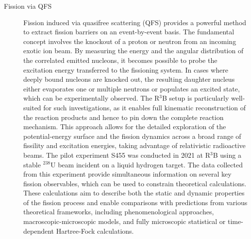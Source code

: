 \begin{description}
\item[Fission via QFS]Fission induced via quasifree scattering (QFS) provides a powerful method to extract fission barriers on an event-by-event basis. The fundamental concept involves the knockout of a proton or neutron from an incoming exotic ion beam. By measuring the energy  and the angular distribution of the correlated emitted nucleons, it becomes possible to probe the excitation energy transferred to the fissioning system. In cases where deeply bound nucleons are knocked out, the resulting daughter nucleus either evaporates one or multiple neutrons or populates an excited state, which can be experimentally observed. The R$^3$B setup is particularly well-suited for such investigations, as it enables full kinematic reconstruction of the reaction products and hence to pin down the complete reaction mechanism. This approach allows for the detailed exploration of the potential-energy surface and the fission dynamics across a broad range of fissility and excitation energies, taking advantage of relativistic radioactive beams.\newline
The pilot experiment S455 was conducted in 2021 at R$^3$B using a stable $^{238}$U beam incident on a liquid hydrogen target. The data collected from this experiment provide simultaneous information on several key fission observables, which can be used to constrain theoretical calculations. These calculations aim to describe both the static and dynamic properties of the fission process and enable comparisons with predictions from various theoretical frameworks, including phenomenological approaches, macroscopic-microscopic models, and fully microscopic statistical or time-dependent Hartree-Fock calculations.\newline

\end{description}

